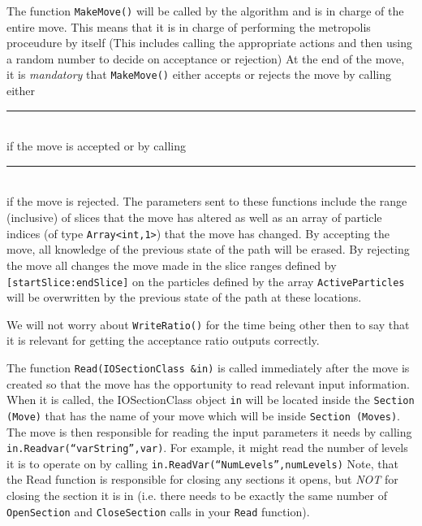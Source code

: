 \documentclass{book}
\begin{document}
The function \texttt{MakeMove()} will be called by the algorithm 
and is in charge of the entire move. This means that it is in charge
of performing the metropolis proceudure by itself (This includes calling
the appropriate actions and then using a random number to decide on 
acceptance or rejection)
At the end of the move, it is {\em mandatory} that \texttt{MakeMove()} 
either accepts or
rejects the move by calling either \\
\rule{0.6cm}{0cm}\\
if the move is accepted or by calling\\
\rule{0.6cm}{0cm}\\
 if the move is rejected.  
The parameters sent to these functions
include the range (inclusive) of slices that the move has altered as
well as an array of particle indices 
(of type  \texttt{Array<int,1>}) that the move has changed.  
By accepting the move, all knowledge of the previous state of the path
will be erased. By rejecting the move all changes the move made in the
slice ranges defined by \texttt{[startSlice:endSlice]} on the particles defined
by the array \texttt{ActiveParticles} will be overwritten by the previous state
of the path at these locations.  


We will not worry about \texttt{WriteRatio()} for the time being other then to
say that it is relevant for getting the acceptance ratio outputs
correctly.

The function \texttt{Read(IOSectionClass \&in)} is called immediately after the
move is created so that the move has the opportunity to read relevant
input information.  When it is called, the IOSectionClass object
\texttt{in} will be located inside the \texttt{Section (Move)} that 
has the name of your move which
will be inside \texttt{Section (Moves)}.
 The move is then responsible for reading the input parameters it needs
by calling \texttt{in.Readvar(``varString'',var)}. For example, it might read the 
number of levels it is to operate on by calling 
\texttt{in.ReadVar(``NumLevels'',numLevels)} Note,
that the Read function is responsible for closing any sections it
opens, but {\em NOT} for closing the section it is in (i.e. there needs to
be exactly the same number of \texttt{OpenSection} and 
\texttt{CloseSection} calls in
your \texttt{Read} function).
\end{document}
